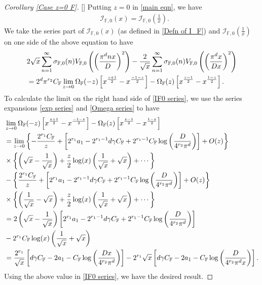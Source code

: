 \documentclass[12pt,reqno]{amsart}
\renewcommand{\(}{\left\(}
\renewcommand{\)}{\right\)}
\renewcommand{\[}{\left\[}
\renewcommand{\]}{\right\]}
\numberwithin{equation}{section}
\theoremstyle{plain}
\begin{document}
\begin{proof}[Corollary \rm{\ref{Case z=0 F}}][]
Putting $z=0$ in \eqref{main eqn}, we have
\begin{align*}
&\mathcal{I}_{\mathbb{F}, 0}(x) = \mathcal{I}_{\mathbb{F}, 0}\left(\frac{1}{x}\right).
\end{align*}
We take the series part of $\mathcal{I}_{\mathbb{F}, 0}(x)$ (as defined in 
\eqref{Defn of I_F}) and $\mathcal{I}_{\mathbb{F}, 0}\left(\frac{1}{x}\right)$ on one side of the above equation to have
\begin{align}
&2\sqrt{x}\sum_{n=1}^{\infty}\sigma_{\mathbb{F}, 0}(n)V_{\mathbb{F},0}\left(\left(\frac{\pi^{d} n x}{D}\right)^2\right) - \frac{2}{\sqrt{x}}\sum_{n=1}^{\infty}\sigma_{\mathbb{F}, 0}(n)V_{\mathbb{F},0}\left(\left(\frac{\pi^{d} x}{Dx}\right)^2\right)
 \notag \\
&= 2^d\pi^{r_2}C_{\mathbb{F}}\lim_{z \rightarrow 0}\Omega_{\mathbb{F}}(-z)\left[x^{\frac{z+1}{2}} - x^{\frac{-1-z}{2}}\right] - \Omega_{\mathbb{F}}(z)\left[x^{\frac{z-1}{2}} - x^{\frac{1-z}{2}}\right]. \label{IF0 series}
\end{align}
{\allowdisplaybreaks
To calculate the limit on the right hand side of \eqref{IF0 series}, we use the series expansions \eqref{exp series} and \eqref{Omega series} to have
\begin{align*}
&\lim_{z \rightarrow 0}\Omega_{\mathbb{F}}(-z)\left[x^{\frac{z+1}{2}} - x^{\frac{-1-z}{2}}\right] - \Omega_{\mathbb{F}}(z)\left[x^{\frac{z-1}{2}} - x^{\frac{1-z}{2}}\right] \notag \\
&= \lim_{z \to 0}\left\{-\frac{2^{r_1}C_\mathbb{F}}{z} + \left[2^{r_1}a_1 - 2^{r_1-1}d\gamma C_\mathbb{F} + 2^{r_1-1}C_\mathbb{F}\log\left(\frac{D}{4^{r_2}\pi^d}\right)\right] + O(z)\right\}\notag \\
&\times \left\{\left(\sqrt{x}-\frac{1}{\sqrt{x}}\right)+ \frac{z}{2}\log(x)\left(\frac{1}{\sqrt{x}}+\sqrt{x}\right)+ \cdots\right\}\notag \\
&- \left\{\frac{2^{r_1}C_\mathbb{F}}{z} + \left[2^{r_1}a_1 - 2^{r_1-1}d\gamma C_\mathbb{F} + 2^{r_1-1}C_\mathbb{F}\log\left(\frac{D}{4^{r_2}\pi^d}\right)\right] + O(z)\right\}\notag \\
&\times \left\{\left(\frac{1}{\sqrt{x}}-\sqrt{x}\right)+ \frac{z}{2}\log(x)\left(\frac{1}{\sqrt{x}}+\sqrt{x}\right)+\cdots \right\} \notag \\
&= 2\left(\sqrt{x}-\frac{1}{\sqrt{x}}\right)\left[2^{r_1}a_1 - 2^{r_1-1}d\gamma C_\mathbb{F} + 2^{r_1-1}C_\mathbb{F}\log\left(\frac{D}{4^{r_2}\pi^d}\right)\right] \notag\\
&- 2^{r_1}C_\mathbb{F}\log(x)\left(\frac{1}{\sqrt{x}}+\sqrt{x}\right) \notag \\
&= \frac{2^{r_1}}{\sqrt{x}}\left[d\gamma C_\mathbb{F} - 2a_1  - C_\mathbb{F}\log\left(\frac{Dx}{4^{r_2}\pi^d}\right)\right] - 2^{r_1}\sqrt{x}\left[d\gamma C_\mathbb{F} - 2a_1 - C_\mathbb{F}\log\left(\frac{D}{4^{r_2}\pi^d x}\right)\right].
\end{align*}}
Using the above value in \eqref{IF0 series}, we have the desired result.
\end{proof}
\end{document}
